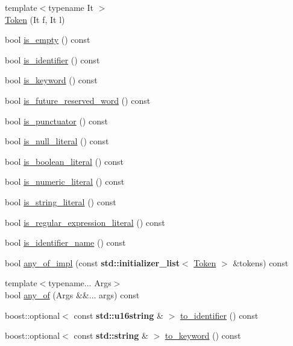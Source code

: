 \begin{DoxyCompactItemize}
\item 
{\footnotesize template$<$typename It $>$ }\\\hyperlink{class_token_a3b8654007e4cd9b3074dbe8300cf67bf}{Token} (It f, It l)
\item 
bool \hyperlink{class_token_aaebab1fc38280c1e7714254916495103}{is\+\_\+empty} () const
\item 
bool \hyperlink{class_token_a3099586a66bb18eafee512ba32f3b75d}{is\+\_\+identifier} () const
\item 
bool \hyperlink{class_token_a73de586a62c6a20442a3d5218f248056}{is\+\_\+keyword} () const
\item 
bool \hyperlink{class_token_a3744fa3b281fc78d02eae4174119b93d}{is\+\_\+future\+\_\+reserved\+\_\+word} () const
\item 
bool \hyperlink{class_token_a9c6bbf326f7cec9fef706afe7ae018ad}{is\+\_\+punctuator} () const
\item 
bool \hyperlink{class_token_a164aae8af0eb44720bd198169349c5c6}{is\+\_\+null\+\_\+literal} () const
\item 
bool \hyperlink{class_token_a4a628c34f5ac213787a74b19a5d862d9}{is\+\_\+boolean\+\_\+literal} () const
\item 
bool \hyperlink{class_token_acf4f9a4d866ea0b67054b01cd4ea4f0f}{is\+\_\+numeric\+\_\+literal} () const
\item 
bool \hyperlink{class_token_ad11f807932449af30ca904eac2e4a350}{is\+\_\+string\+\_\+literal} () const
\item 
bool \hyperlink{class_token_a067bf14791d50fb4d98f3bb67de26307}{is\+\_\+regular\+\_\+expression\+\_\+literal} () const
\item 
bool \hyperlink{class_token_a00ae85f794f2c6a2da22b1454ecd4e84}{is\+\_\+identifier\+\_\+name} () const
\item 
bool \hyperlink{class_token_abefa8f417ddd59dcb37a2cfd357a51bf}{any\+\_\+of\+\_\+impl} (const \textbf{ std\+::initializer\+\_\+list}$<$ \hyperlink{class_token}{Token} $>$ \&tokens) const
\item 
{\footnotesize template$<$typename... Args$>$ }\\bool \hyperlink{class_token_a6dd181cd1f4570aff7d7ddd5714ca582}{any\+\_\+of} (Args \&\&... args) const
\item 
boost\+::optional$<$ const \textbf{ std\+::u16string} \& $>$ \hyperlink{class_token_ac17d83844f2b4bc36f20e2686d84e7a4}{to\+\_\+identifier} () const
\item 
boost\+::optional$<$ const \textbf{ std\+::string} \& $>$ \hyperlink{class_token_a4e83b79ea7bbfad2ff31bb0854f602d4}{to\+\_\+keyword} () const

\end{DoxyCompactItemize}
